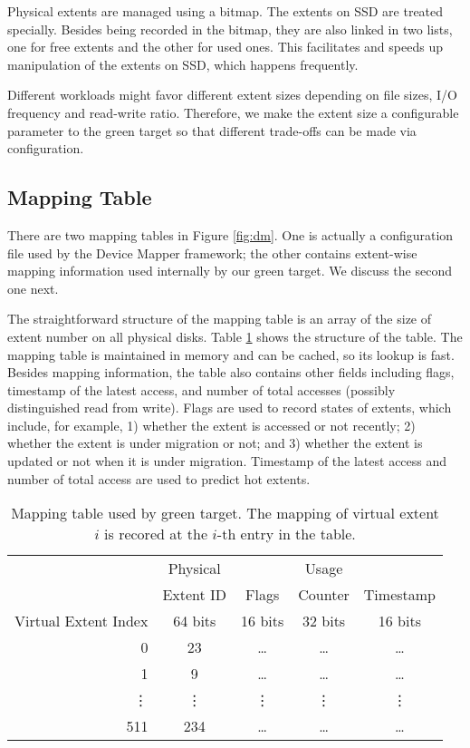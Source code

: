 Physical extents are managed using a bitmap. The extents on SSD are
treated specially. Besides being recorded in the bitmap, they are also
linked in two lists, one for free extents and the other for used ones.
This facilitates and speeds up manipulation of the extents on SSD,
which happens frequently.

Different workloads might favor different extent sizes depending on
file sizes, I/O frequency and read-write ratio. Therefore, we make the
extent size a configurable parameter to the green target so that
different trade-offs can be made via configuration. 


\subsection{Mapping Table}

There are two mapping tables in Figure \ref{fig:dm}. One is actually a
configuration file used by the Device Mapper framework; the other
contains extent-wise mapping information used internally by our green
target. We discuss the second one next.

The straightforward structure of the mapping table is an array of the
size of extent number on all physical disks. Table
\ref{tab:greemtable} shows the structure of the table. The mapping
table is maintained in memory and can be cached, so its lookup is
fast. Besides mapping information, the table also contains other
fields including flags, timestamp of the latest access, and number of
total accesses (possibly distinguished read from write). Flags are
used to record states of extents, which include, for example, 1)
whether the extent is accessed or not recently; 2) whether the extent
is under migration or not; and 3) whether the extent is updated or not
when it is under migration. Timestamp of the latest access and number
of total access are used to predict hot extents.

\begin{table}[t]
{\footnotesize
\centering
\begin{tabular}{r|c|c|c|c|}
\cline{2-5}
\cline{2-5}
  & Physical & & Usage & \\ 
  & Extent ID & Flags & Counter & Timestamp \\
 Virtual Extent Index & 64 bits & 16 bits & 32 bits & 16 bits\\ \cline{2-5} 
 0 & 23 & \dots & \dots & \dots \\
 1 & 9 & \dots & \dots & \dots \\ 
 \vdots & \vdots & \vdots & \vdots & \vdots \\ 
 511 & 234 & \dots & \dots & \dots \\ \cline{2-5}
  \end{tabular}
}
 \caption{Mapping table used by green target. The mapping of virtual
extent $i$ is recored at the $i$-th entry in the table.}
\label{tab:greemtable}

\end{table}

